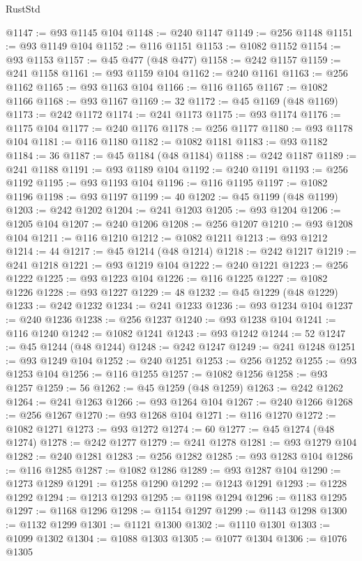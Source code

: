 \begin{lexlean}{RustStd}
\begin{coremodule}
@1147 := @93 @1145 @104
@1148 := @240 @1147
@1149 := @256 @1148
@1151 := @93 @1149 @104
@1152 := @116 @1151
@1153 := @1082 @1152
@1154 := @93 @1153
@1157 := @45 @477 (@48 @477)
@1158 := @242 @1157
@1159 := @241 @1158
@1161 := @93 @1159 @104
@1162 := @240 @1161
@1163 := @256 @1162
@1165 := @93 @1163 @104
@1166 := @116 @1165
@1167 := @1082 @1166
@1168 := @93 @1167
@1169 := 32
@1172 := @45 @1169 (@48 @1169)
@1173 := @242 @1172
@1174 := @241 @1173
@1175 := @93 @1174
@1176 := @1175 @104
@1177 := @240 @1176
@1178 := @256 @1177
@1180 := @93 @1178 @104
@1181 := @116 @1180
@1182 := @1082 @1181
@1183 := @93 @1182
@1184 := 36
@1187 := @45 @1184 (@48 @1184)
@1188 := @242 @1187
@1189 := @241 @1188
@1191 := @93 @1189 @104
@1192 := @240 @1191
@1193 := @256 @1192
@1195 := @93 @1193 @104
@1196 := @116 @1195
@1197 := @1082 @1196
@1198 := @93 @1197
@1199 := 40
@1202 := @45 @1199 (@48 @1199)
@1203 := @242 @1202
@1204 := @241 @1203
@1205 := @93 @1204
@1206 := @1205 @104
@1207 := @240 @1206
@1208 := @256 @1207
@1210 := @93 @1208 @104
@1211 := @116 @1210
@1212 := @1082 @1211
@1213 := @93 @1212
@1214 := 44
@1217 := @45 @1214 (@48 @1214)
@1218 := @242 @1217
@1219 := @241 @1218
@1221 := @93 @1219 @104
@1222 := @240 @1221
@1223 := @256 @1222
@1225 := @93 @1223 @104
@1226 := @116 @1225
@1227 := @1082 @1226
@1228 := @93 @1227
@1229 := 48
@1232 := @45 @1229 (@48 @1229)
@1233 := @242 @1232
@1234 := @241 @1233
@1236 := @93 @1234 @104
@1237 := @240 @1236
@1238 := @256 @1237
@1240 := @93 @1238 @104
@1241 := @116 @1240
@1242 := @1082 @1241
@1243 := @93 @1242
@1244 := 52
@1247 := @45 @1244 (@48 @1244)
@1248 := @242 @1247
@1249 := @241 @1248
@1251 := @93 @1249 @104
@1252 := @240 @1251
@1253 := @256 @1252
@1255 := @93 @1253 @104
@1256 := @116 @1255
@1257 := @1082 @1256
@1258 := @93 @1257
@1259 := 56
@1262 := @45 @1259 (@48 @1259)
@1263 := @242 @1262
@1264 := @241 @1263
@1266 := @93 @1264 @104
@1267 := @240 @1266
@1268 := @256 @1267
@1270 := @93 @1268 @104
@1271 := @116 @1270
@1272 := @1082 @1271
@1273 := @93 @1272
@1274 := 60
@1277 := @45 @1274 (@48 @1274)
@1278 := @242 @1277
@1279 := @241 @1278
@1281 := @93 @1279 @104
@1282 := @240 @1281
@1283 := @256 @1282
@1285 := @93 @1283 @104
@1286 := @116 @1285
@1287 := @1082 @1286
@1289 := @93 @1287 @104
@1290 := @1273 @1289
@1291 := @1258 @1290
@1292 := @1243 @1291
@1293 := @1228 @1292
@1294 := @1213 @1293
@1295 := @1198 @1294
@1296 := @1183 @1295
@1297 := @1168 @1296
@1298 := @1154 @1297
@1299 := @1143 @1298
@1300 := @1132 @1299
@1301 := @1121 @1300
@1302 := @1110 @1301
@1303 := @1099 @1302
@1304 := @1088 @1303
@1305 := @1077 @1304
@1306 := @1076 @1305

\end{coremodule}
\end{lexlean}
